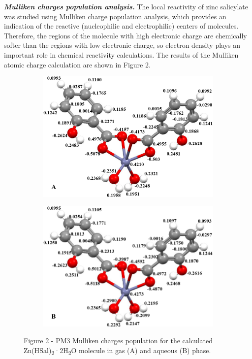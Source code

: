 \begin{multicols}{2}
\emph{{\bfseries Mulliken charges population analysis.}} The local
reactivity of zinc salicylate was studied using Mulliken charge
population analysis, which provides an indication of the reactive
(nucleophilic and electrophilic) centers of molecules. Therefore, the
regions of the molecule with high electronic charge are chemically
softer than the regions with low electronic charge, so electron density
plays an important role in chemical reactivity calculations. The results
of the Mulliken atomic charge calculation are shown in Figure 2.
\end{multicols}

\begin{figure}[H]
    \centering
    \begin{subfigure}[b]{0.45\textwidth}
        \centering
        \includegraphics[width=\textwidth]{assets/39}
    \end{subfigure}
    \hfill
    \begin{subfigure}[b]{0.45\textwidth}
        \centering
        \includegraphics[width=\textwidth]{assets/40}
    \end{subfigure}
    \caption*{Figure 2 - PM3 Mulliken charges population for the calculated Zn(HSal)\textsubscript{2}·2H\textsubscript{2}O molecule in gas (A) and aqueous (B) phase.}
\end{figure}

